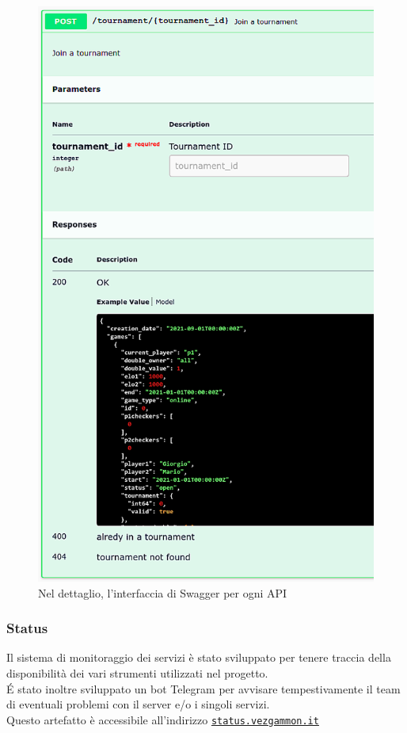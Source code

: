 \documentclass{article}
\begin{document}
\begin{figure}[H]
\begin{minipage}[t]{0.49\textwidth}
        \includegraphics[width=\textwidth]{sw_joinTournament}
        \caption{Nel dettaglio, l'interfaccia di Swagger per ogni API}
        \label{fig:sw_joinTournament}
    \end{minipage}    
\end{figure}


\subsubsection{Status}
\label{sec:status}
Il sistema di monitoraggio dei servizi è stato sviluppato per tenere traccia della disponibilità dei vari strumenti utilizzati nel progetto. \\
\'E stato inoltre sviluppato un bot Telegram per avvisare tempestivamente il team di eventuali problemi con il server e/o i singoli servizi. \\
Questo artefatto è accessibile all'indirizzo \href{https://status.vezgammon.it}{\texttt{status.vezgammon.it}}
\end{document}
